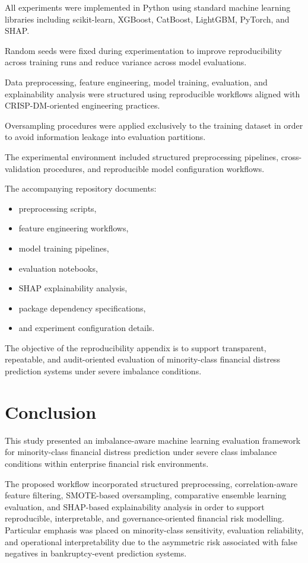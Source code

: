 \documentclass{article}
\begin{document}
All experiments were implemented in Python using standard machine learning libraries including scikit-learn, XGBoost, CatBoost, LightGBM, PyTorch, and SHAP.

Random seeds were fixed during experimentation to improve reproducibility across training runs and reduce variance across model evaluations.

Data preprocessing, feature engineering, model training, evaluation, and explainability analysis were structured using reproducible workflows aligned with CRISP-DM-oriented engineering practices.

Oversampling procedures were applied exclusively to the training dataset in order to avoid information leakage into evaluation partitions.

The experimental environment included structured preprocessing pipelines, cross-validation procedures, and reproducible model configuration workflows.

The accompanying repository documents:

\begin{itemize}
    \item preprocessing scripts,
    \item feature engineering workflows,
    \item model training pipelines,
    \item evaluation notebooks,
    \item SHAP explainability analysis,
    \item package dependency specifications,
    \item and experiment configuration details.
\end{itemize}

The objective of the reproducibility appendix is to support transparent, repeatable, and audit-oriented evaluation of minority-class financial distress prediction systems under severe imbalance conditions.

\section{Conclusion}

This study presented an imbalance-aware machine learning evaluation framework for minority-class financial distress prediction under severe class imbalance conditions within enterprise financial risk environments.

The proposed workflow incorporated structured preprocessing, correlation-aware feature filtering, SMOTE-based oversampling, comparative ensemble learning evaluation, and SHAP-based explainability analysis in order to support reproducible, interpretable, and governance-oriented financial risk modelling. Particular emphasis was placed on minority-class sensitivity, evaluation reliability, and operational interpretability due to the asymmetric risk associated with false negatives in bankruptcy-event prediction systems.
\end{document}
